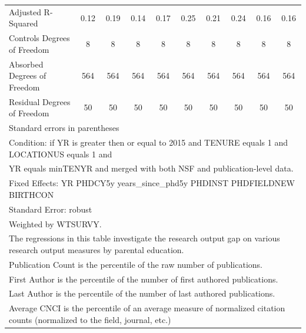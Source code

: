 \begin{table}[htbp]
\begin{tabular}{l*{9}{c}}
Adjusted R-Squared&        0.12         &        0.19         &        0.14         &        0.17         &        0.25         &        0.21         &        0.24         &        0.16         &        0.16         \\
Controls Degrees of Freedom&           8         &           8         &           8         &           8         &           8         &           8         &           8         &           8         &           8         \\
Absorbed Degrees of Freedom&         564         &         564         &         564         &         564         &         564         &         564         &         564         &         564         &         564         \\
Residual Degrees of Freedom&          50         &          50         &          50         &          50         &          50         &          50         &          50         &          50         &          50         \\
\hline\hline
\multicolumn{10}{l}{\footnotesize Standard errors in parentheses}\\
\multicolumn{10}{l}{\footnotesize Condition: if YR is greater then or equal to 2015 and TENURE equals 1 and LOCATIONUS equals 1 and}\\
\multicolumn{10}{l}{\footnotesize YR equals minTENYR and merged with both NSF and publication-level data.}\\
\multicolumn{10}{l}{\footnotesize Fixed Effects: YR PHDCY5y years\_since\_phd5y PHDINST PHDFIELDNEW BIRTHCON}\\
\multicolumn{10}{l}{\footnotesize Standard Error: robust}\\
\multicolumn{10}{l}{\footnotesize Weighted by WTSURVY.}\\
\multicolumn{10}{l}{\footnotesize The regressions in this table investigate the research output gap on various research output measures by parental education.}\\
\multicolumn{10}{l}{\footnotesize Publication Count is the percentile of the raw number of publications.}\\
\multicolumn{10}{l}{\footnotesize First Author is the percentile of the number of first authored publications.}\\
\multicolumn{10}{l}{\footnotesize Last Author is the percentile of the number of last authored publications.}\\
\multicolumn{10}{l}{\footnotesize Average CNCI is the percentile of an average measure of normalized citation counts (normalized to the field, journal, etc.)}\\

\end{tabular}
\end{table}
